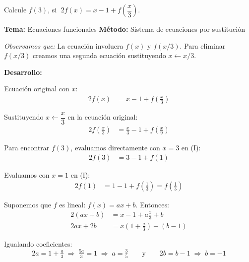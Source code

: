 \begin{tcolorbox}[
  enhanced, breakable,
  colback=GrisClaro, colframe=AzulPizarra,
  fonttitle=\bfseries\sffamily\color{white},
  title={Álgebra — Ejercicio 3},
  arc=3pt, boxrule=0.8pt
]

\begin{problema}
  Calcule $f(3)$, si $\;2f(x) = x - 1 + f\!\left(\dfrac{x}{3}\right)$.
\end{problema}

\smallskip
\noindent
\textbf{\sffamily\color{AzulMedio}Tema:} Ecuaciones funcionales \hfill
\textbf{\sffamily\color{AzulMedio}Método:} Sistema de ecuaciones por sustitución

\medskip
\noindent\textit{Observamos que:} La ecuación involucra $f(x)$ y $f(x/3)$.
Para eliminar $f(x/3)$ creamos una segunda ecuación sustituyendo $x \leftarrow x/3$.

\noindent\textbf{\sffamily Desarrollo:}

Ecuación original con $x$:
\begin{align}
  2f(x) &= x - 1 + f\!\left(\tfrac{x}{3}\right) \tag{I}
\end{align}

Sustituyendo $x \leftarrow \dfrac{x}{3}$ en la ecuación original:
\begin{align}
  2f\!\left(\tfrac{x}{3}\right) &= \tfrac{x}{3} - 1 + f\!\left(\tfrac{x}{9}\right) \tag{II}
\end{align}

Para encontrar $f(3)$, evaluamos directamente con $x = 3$ en (I):
\begin{align*}
  2f(3) &= 3 - 1 + f(1) \tag{I con $x=3$}
\end{align*}

Evaluamos con $x = 1$ en (I):
\begin{align*}
  2f(1) &= 1 - 1 + f\!\left(\tfrac{1}{3}\right) = f\!\left(\tfrac{1}{3}\right) \tag{I con $x=1$}
\end{align*}

Suponemos que $f$ es lineal: $f(x) = ax + b$. Entonces:
\begin{align*}
  2(ax + b) &= x - 1 + a\tfrac{x}{3} + b \\
  2ax + 2b  &= x\!\left(1 + \tfrac{a}{3}\right) + (b - 1)
\end{align*}

Igualando coeficientes:
\[
  2a = 1 + \tfrac{a}{3} \;\Rightarrow\; \tfrac{5a}{3} = 1 \;\Rightarrow\; a = \tfrac{3}{5}
  \qquad\text{y}\qquad
  2b = b - 1 \;\Rightarrow\; b = -1
\]


\end{tcolorbox}
